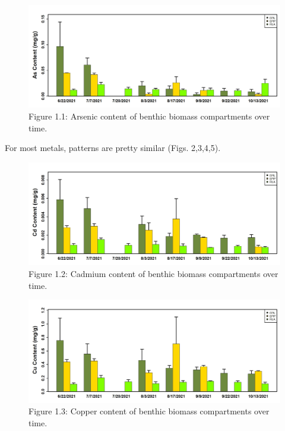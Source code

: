 \documentclass[
]{article}
\begin{document}
\begin{figure}
\includegraphics[width=1\linewidth]{Figures/1} \caption[Figure 1.1]{Figure 1.1: Arsenic content of benthic biomass compartments over time.}\label{fig:unnamed-chunk-1}
\end{figure}

\FloatBarrier

For most metals, patterns are pretty similar (Figs. 2,3,4,5).

\begin{figure}
\includegraphics[width=1\linewidth]{Figures/2} \caption[Figure 1.2]{Figure 1.2: Cadmium content of benthic biomass compartments over time.}\label{fig:unnamed-chunk-2}
\end{figure}

\FloatBarrier

\begin{figure}
\includegraphics[width=1\linewidth]{Figures/3} \caption[Figure 1.3]{Figure 1.3: Copper content of benthic biomass compartments over time.}\label{fig:unnamed-chunk-3}
\end{figure}
\end{document}
